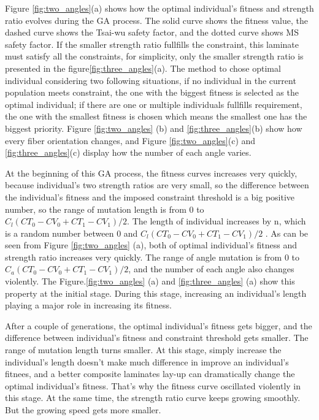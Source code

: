 Figure \ref{fig:two_angles}(a) shows how the optimal individual's fitness and
strength ratio evolves during the GA process. The solid curve shows the fitness
value, the dashed curve shows the Tsai-wu safety factor, and the dotted curve
shows MS safety factor. If the smaller strength ratio fullfills the constraint,
this laminate must satisfy all the constraints, for simplicity, only the smaller
strength ratio is presented in the figure\ref{fig:three_angles}(a). The method
to chose optimal individual considering two following situations, if no
individual in the current population meets constraint, the one with the biggest
fitness is selected as the optimal individual; if there are one or multiple
individuals fullfills requirement, the one with the smallest fitness is chosen which
means the smallest one has the biggest priority.  Figure \ref{fig:two_angles}
(b) and \ref{fig:three_angles}(b) show how every fiber orientation changes, and
Figure \ref{fig:two_angles}(c) and \ref{fig:three_angles}(c) display how the
number of each angle varies.

At the beginning of this GA process, the fitness curves increases very quickly,
because individual's two strength ratios are very small, so the difference
between the individual's fitness and the imposed constraint threshold is a big
positive number, so the range of mutation length is from 0 to $C_l(CT_0 - CV_0 +
CT_1 - CV_1)/2$.  The length of individual increases by n, which is a random
number between 0 and $C_l(CT_0 - CV_0 + CT_1 - CV_1)/2$ . As can be seen from
Figure \ref{fig:two_angles} (a), both of optimal individual's fitness and
strength ratio increases very quickly.  The range of angle mutation is from 0 to
$C_a(CT_0 - CV_0 + CT_1 - CV_1)/2$, and the number of each angle also changes
violently. The Figure.\ref{fig:two_angles} (a) and \ref{fig:three_angles} (a) show
this property at the initial stage.  During this stage, increasing an individual's length playing a
major role in increasing its fitness.

After a couple of generations, the optimal individual's fitness gets bigger, and
the difference between individual's fitness and constraint threshold gets
smaller. The range of mutation length turns smaller. At
this stage, simply increase the individual's length doesn't make much difference
in improve an individual's fitnees, and a better composite laminates lay-up can
dramatically change the optimal individual's fitness. That's why the fitness curve
oscillated violently in this stage.  At the same time, the strength ratio curve
keeps growing smoothly. But the growing speed gets more smaller.

